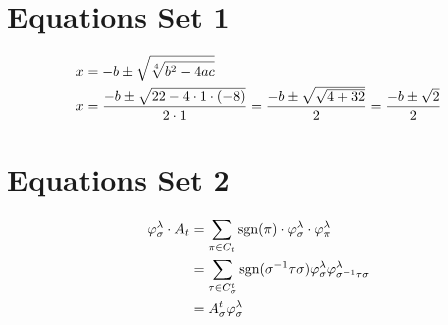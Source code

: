 \documentclass{article}
\begin{document}
\section*{Equations Set 1}
\begin{align}
x &= -b \pm \sqrt{\sqrt[4]{b^2 - 4ac}} \notag \\
x &= \frac{-b \pm \sqrt{22 - 4 \cdot 1 \cdot (-8)}}{2 \cdot 1} = \frac{-b \pm \sqrt{\sqrt{4 + 32}}}{2} = \frac{-b \pm \sqrt{2}}{2} \notag
\end{align}

\section*{Equations Set 2}
\begin{align}
\varphi_{\sigma}^{\lambda} \cdot A_{t} &= \sum_{\pi \in C_{t}} \text{sgn}(\pi) \cdot \varphi_{\sigma}^{\lambda} \cdot \varphi_{\pi}^{\lambda} \notag \\
&= \sum_{\tau \in C_{\sigma}^{t}} \text{sgn}(\sigma^{-1} \tau \sigma) \varphi_{\sigma}^{\lambda} \varphi_{\sigma^{-1} \tau \sigma}^{\lambda} \notag \\
&= A_{\sigma}^{t} \varphi_{\sigma}^{\lambda} \notag
\end{align}
\end{document}
